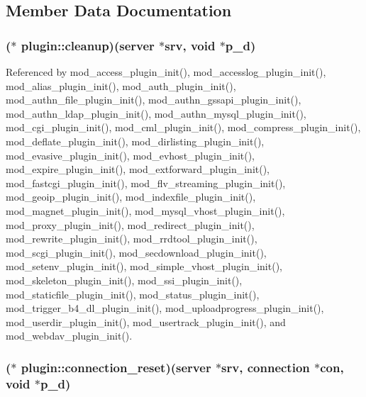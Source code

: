 \subsection{Member Data Documentation}
\hypertarget{structplugin_ac092882ffd286543515174a8bd3b70d2}{
\subsubsection[{cleanup}]{($\ast$  plugin\-::cleanup)({\bf server} $\ast$srv, void $\ast$p\-\_\-d)}}\label{structplugin_ac092882ffd286543515174a8bd3b70d2}


Referenced by mod\-\_\-access\-\_\-plugin\-\_\-init(), mod\-\_\-accesslog\-\_\-plugin\-\_\-init(), mod\-\_\-alias\-\_\-plugin\-\_\-init(), mod\-\_\-auth\-\_\-plugin\-\_\-init(), mod\-\_\-authn\-\_\-file\-\_\-plugin\-\_\-init(), mod\-\_\-authn\-\_\-gssapi\-\_\-plugin\-\_\-init(), mod\-\_\-authn\-\_\-ldap\-\_\-plugin\-\_\-init(), mod\-\_\-authn\-\_\-mysql\-\_\-plugin\-\_\-init(), mod\-\_\-cgi\-\_\-plugin\-\_\-init(), mod\-\_\-cml\-\_\-plugin\-\_\-init(), mod\-\_\-compress\-\_\-plugin\-\_\-init(), mod\-\_\-deflate\-\_\-plugin\-\_\-init(), mod\-\_\-dirlisting\-\_\-plugin\-\_\-init(), mod\-\_\-evasive\-\_\-plugin\-\_\-init(), mod\-\_\-evhost\-\_\-plugin\-\_\-init(), mod\-\_\-expire\-\_\-plugin\-\_\-init(), mod\-\_\-extforward\-\_\-plugin\-\_\-init(), mod\-\_\-fastcgi\-\_\-plugin\-\_\-init(), mod\-\_\-flv\-\_\-streaming\-\_\-plugin\-\_\-init(), mod\-\_\-geoip\-\_\-plugin\-\_\-init(), mod\-\_\-indexfile\-\_\-plugin\-\_\-init(), mod\-\_\-magnet\-\_\-plugin\-\_\-init(), mod\-\_\-mysql\-\_\-vhost\-\_\-plugin\-\_\-init(), mod\-\_\-proxy\-\_\-plugin\-\_\-init(), mod\-\_\-redirect\-\_\-plugin\-\_\-init(), mod\-\_\-rewrite\-\_\-plugin\-\_\-init(), mod\-\_\-rrdtool\-\_\-plugin\-\_\-init(), mod\-\_\-scgi\-\_\-plugin\-\_\-init(), mod\-\_\-secdownload\-\_\-plugin\-\_\-init(), mod\-\_\-setenv\-\_\-plugin\-\_\-init(), mod\-\_\-simple\-\_\-vhost\-\_\-plugin\-\_\-init(), mod\-\_\-skeleton\-\_\-plugin\-\_\-init(), mod\-\_\-ssi\-\_\-plugin\-\_\-init(), mod\-\_\-staticfile\-\_\-plugin\-\_\-init(), mod\-\_\-status\-\_\-plugin\-\_\-init(), mod\-\_\-trigger\-\_\-b4\-\_\-dl\-\_\-plugin\-\_\-init(), mod\-\_\-uploadprogress\-\_\-plugin\-\_\-init(), mod\-\_\-userdir\-\_\-plugin\-\_\-init(), mod\-\_\-usertrack\-\_\-plugin\-\_\-init(), and mod\-\_\-webdav\-\_\-plugin\-\_\-init().

\hypertarget{structplugin_a5c3bbcff69dfdf5c591c0a420b38c055}{
\subsubsection[{connection\-\_\-reset}]{($\ast$  plugin\-::connection\-\_\-reset)({\bf server} $\ast$srv, {\bf connection} $\ast$con, void $\ast$p\-\_\-d)}}\label{structplugin_a5c3bbcff69dfdf5c591c0a420b38c055}


